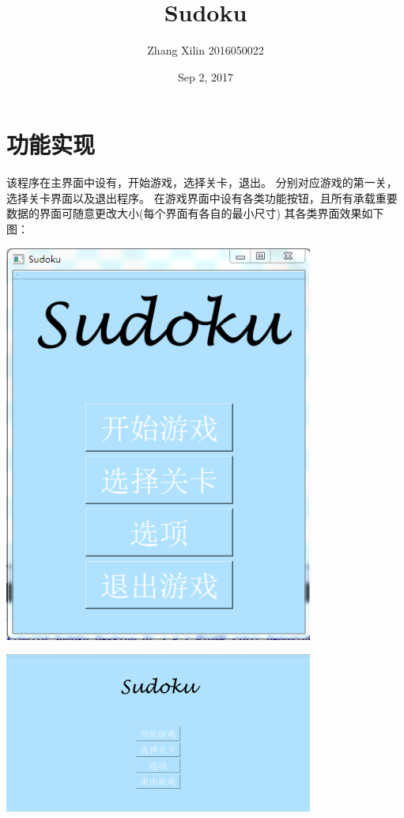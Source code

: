 \documentclass[hyperref,UTF8]{ctexart}
\begin{document}
\title{Sudoku}
\author{Zhang Xilin 2016050022}
\date{Sep 2, 2017}
\maketitle

\vspace {2cm}


\newpage

\tableofcontents

\newpage

\section{功能实现}
    该程序在主界面中设有，开始游戏，选择关卡，退出。
    分别对应游戏的第一关，选择关卡界面以及退出程序。
    在游戏界面中设有各类功能按钮，且所有承载重要数据的界面可随意更改大小(每个界面有各自的最小尺寸)
    其各类界面效果如下图：

\begin{center}
\includegraphics[width=4in]{theme.PNG}
\end{center}

\begin{center}
\includegraphics[width=4in]{theme1.PNG}
\end{center}
\end{document}
